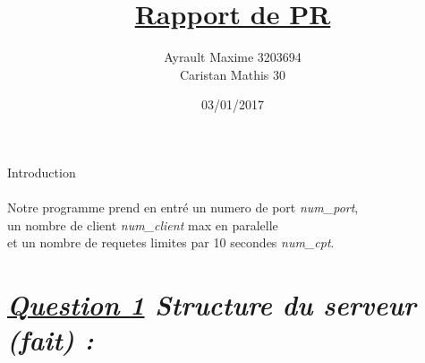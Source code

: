 \documentclass[final,twoside,onecolumn,10pt]{article}
\begin{document}
%
\title{{\color{red} \ul {Rapport de PR}}}
\author{{Ayrault Maxime 3203694\\Caristan Mathis 30}}
%
\date{03/01/2017}

\maketitle
%

\newpage
{\huge Introduction\\\\}
\label{intro}
\large Notre programme prend en entr\'e un numero de port {\itshape
  num\_port},\\
\large un nombre de client {\itshape num\_client} max en paralelle\\
\large et un nombre de requetes limites par 10 secondes {\itshape num\_cpt}. 


\newpage
\section{{ {\itshape \ul {Question 1} Structure du serveur (fait) : }}}
\end{document}
